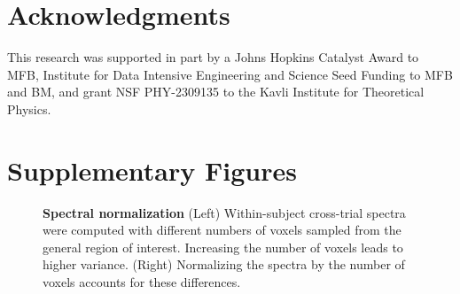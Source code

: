 \documentclass[10pt]{article}
\begin{document}
\section{Acknowledgments}\label{acknowledgments}

This research was supported in part by a Johns Hopkins Catalyst Award to
MFB, Institute for Data Intensive Engineering and Science Seed Funding
to MFB and BM, and grant NSF PHY-2309135 to the Kavli Institute for
Theoretical Physics.

\newpage{}

\section*{Supplementary Figures}\label{supplementary-figures}

\setcounter{figure}{0}
\renewcommand{\thefigure}{S\arabic{figure}}

\begin{figure}[H]


\caption{\label{fig-vary-n-voxels}\textbf{Spectral normalization} (Left)
Within-subject cross-trial spectra were computed with different numbers
of voxels sampled from the general region of interest. Increasing the
number of voxels leads to higher variance. (Right) Normalizing the
spectra by the number of voxels accounts for these differences.}

\end{figure}%
\end{document}
